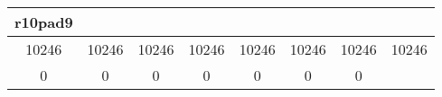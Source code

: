 \documentclass[]{book}
\begin{document}
\begin{longtable}[]{@{}cccccccc@{}}
\begin{minipage}[b]{0.10\columnwidth}
r10pad9\strut
\end{minipage}\tabularnewline
\midrule
\endhead
\begin{minipage}[t]{0.10\columnwidth}\centering\strut
10246\strut
\end{minipage} & \begin{minipage}[t]{0.10\columnwidth}\centering\strut
10246\strut
\end{minipage} & \begin{minipage}[t]{0.10\columnwidth}\centering\strut
10246\strut
\end{minipage} & \begin{minipage}[t]{0.10\columnwidth}\centering\strut
10246\strut
\end{minipage} & \begin{minipage}[t]{0.10\columnwidth}\centering\strut
10246\strut
\end{minipage} & \begin{minipage}[t]{0.10\columnwidth}\centering\strut
10246\strut
\end{minipage} & \begin{minipage}[t]{0.10\columnwidth}\centering\strut
10246\strut
\end{minipage} & \begin{minipage}[t]{0.10\columnwidth}\centering\strut
10246\strut
\end{minipage}\tabularnewline
\begin{minipage}[t]{0.10\columnwidth}\centering\strut
0\strut
\end{minipage} & \begin{minipage}[t]{0.10\columnwidth}\centering\strut
0\strut
\end{minipage} & \begin{minipage}[t]{0.10\columnwidth}\centering\strut
0\strut
\end{minipage} & \begin{minipage}[t]{0.10\columnwidth}\centering\strut
0\strut
\end{minipage} & \begin{minipage}[t]{0.10\columnwidth}\centering\strut
0\strut
\end{minipage} & \begin{minipage}[t]{0.10\columnwidth}\centering\strut
0\strut
\end{minipage} & \begin{minipage}[t]{0.10\columnwidth}\centering\strut
0\strut
\end{minipage} & \begin{minipage}[t]{0.10\columnwidth}\centering\strut

\end{minipage}
\end{longtable}
\end{document}
